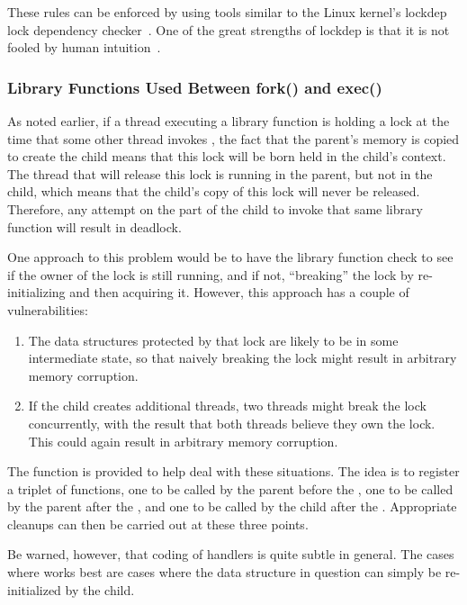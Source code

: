 These rules can be enforced by using tools similar to
the Linux kernel's lockdep lock dependency
checker~\cite{JonathanCorbet2006lockdep}.
One of the great strengths of lockdep is that it is not fooled by
human intuition~\cite{StevenRostedt2011locdepCryptic}.

\subsubsection{Library Functions Used Between fork() and exec()}
\label{sec:locking:Library Functions Used Between fork() and exec()}

As noted earlier, if a thread executing a library function is holding
a lock at the time that some other thread invokes , the
fact that the parent's memory is copied to create the child means that
this lock will be born held in the child's context.
The thread that will release this lock is running in the parent, but not
in the child, which means that the child's copy of this lock will never
be released.
Therefore, any attempt on the part of the child to invoke that same
library function will result in deadlock.

One approach to this problem would be to have the library function
check to see if the owner of the lock is still running, and if not,
``breaking'' the lock by re-initializing and then acquiring it.
However, this approach has a couple of vulnerabilities:

\begin{enumerate}
\item	The data structures protected by that lock are likely to
	be in some intermediate state, so that naively breaking the lock
	might result in arbitrary memory corruption.
\item	If the child creates additional threads, two threads might
	break the lock concurrently, with the result that both
	threads believe they own the lock.
	This could again result in arbitrary memory corruption.
\end{enumerate}

The  function is provided to help deal with these situations.
The idea is to register a triplet of functions, one to be called by the
parent before the , one to be called by the parent after the
, and one to be called by the child after the .
Appropriate cleanups can then be carried out at these three points.

Be warned, however, that coding of  handlers is quite subtle
in general.
The cases where  works best are cases where the data structure
in question can simply be re-initialized by the child.


